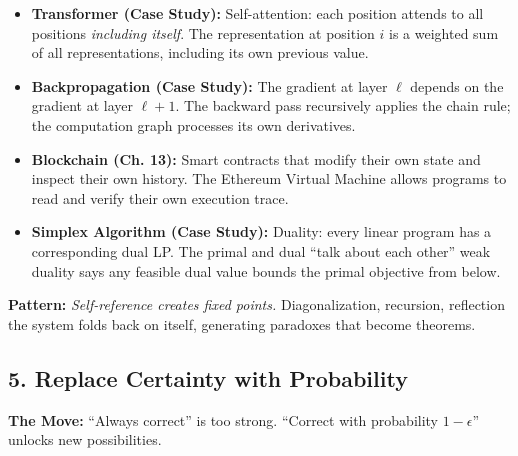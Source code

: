 \begin{itemize}
\item \textbf{Transformer (Case Study):} Self-attention: each position attends to all positions \emph{including itself}. The representation at position $i$ is a weighted sum of all representations, including its own previous value.

\item \textbf{Backpropagation (Case Study):} The gradient at layer $\ell$ depends on the gradient at layer $\ell+1$. The backward pass recursively applies the chain rule; the computation graph processes its own derivatives.

\item \textbf{Blockchain (Ch. 13):} Smart contracts that modify their own state and inspect their own history. The Ethereum Virtual Machine allows programs to read and verify their own execution trace.

\item \textbf{Simplex Algorithm (Case Study):} Duality: every linear program has a corresponding dual LP. The primal and dual ``talk about each other'' weak duality says any feasible dual value bounds the primal objective from below.
\end{itemize}

\textbf{Pattern:} \emph{Self-reference creates fixed points.} Diagonalization, recursion, reflection the system folds back on itself, generating paradoxes that become theorems.
\subsection{5. Replace Certainty with Probability}
\label{sec:anatomy:probability}

\textbf{The Move:} ``Always correct'' is too strong. ``Correct with probability $1-\epsilon$'' unlocks new possibilities.

